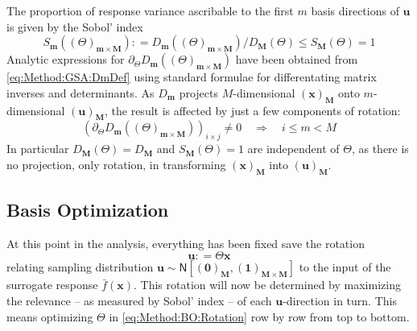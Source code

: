 \documentclass[preprint,12pt]{elsarticle}
\newcommand*{\M}[1]{\ensuremath{#1}\xspace}
\newcommand*{\vr}[1]{\M{\mathbf{#1}}}
\newcommand*{\deq}{\M{\mathrel{\mathop:}=}}
\newcommand*{\gauss}[2]{\mathsf{N}\!\left\lbrack{} #1 , #2 \right\rbrack}
\begin{document}
            The proportion of response variance ascribable to the first $m$ basis directions of $\vr{u}$ is given by the Sobol' index
            \begin{equation} \label{eq:Method:GSA:SDef}
                S_{\vr{m}}((\Theta)_{\vr{m}\times\vr{M}}) \deq D_{\vr{m}}((\Theta)_{\vr{m}\times\vr{M}})/D_{\vr{M}}(\Theta) \leq S_{\vr{M}}(\Theta) = 1
            \end{equation}
            Analytic expressions for $\partial_{\Theta} D_{\vr{m}}((\Theta)_{\vr{m}\times\vr{M}})$ have been obtained from \cref{eq:Method:GSA:DmDef} using standard formulae for differentating matrix inverses and determinants. As $D_{\vr{m}}$ projects $M$-dimensional $(\vr{x})_{\vr{M}}$ onto $m$-dimensional $(\vr{u})_{\vr{M}}$, the result is affected by just a few components of rotation:
            \begin{equation} \label{eq:Method:GSA:partialD}
                \left(\partial_{\Theta} D_{\vr{m}}((\Theta)_{\vr{m}\times\vr{M}})\right)_{i \times j} \neq 0 \quad \Longrightarrow \quad i \leq m < M
            \end{equation}
            In particular $D_{\vr{M}}(\Theta)=D_{\vr{M}}$ and $S_{\vr{M}}(\Theta)=1$ are independent of $\Theta$, as there is no projection, only rotation, in transforming $(\vr{x})_{\vr{M}}$ into $(\vr{u})_{\vr{M}}$.

        \subsection{Basis Optimization} \label{sub:Method:BO}
            At this point in the analysis, everything has been fixed save the rotation
            \begin{equation} \label{eq:Method:BO:Rotation}
                \vr{u} \deq \Theta \vr{x}
            \end{equation}
            relating sampling distribution $\vr{u} \sim \gauss{(\vr{0})_{\vr{M}}}{(\vr{1})_{\vr{M}\times\vr{M}}}$ to the input of the surrogate response $\bar{f}(\vr{x})$. This rotation will now be determined by maximizing the relevance -- as measured by Sobol' index -- of each $\vr{u}$-direction in turn. This means optimizing $\Theta$ in \cref{eq:Method:BO:Rotation} row by row from top to bottom. 
            
\end{document}
